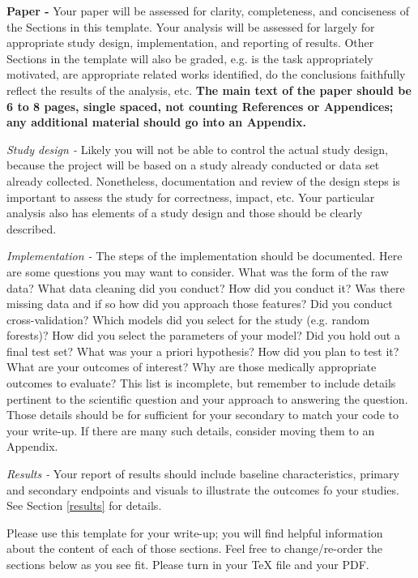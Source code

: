 \documentclass[twoside,11pt]{article}
\begin{document}
\textbf{Paper -} Your paper will be assessed for clarity, completeness, and conciseness of the Sections in this template. Your analysis will be assessed for largely for appropriate study design, implementation, and reporting of results. Other Sections in the template will also be graded, e.g. is the task appropriately motivated, are appropriate related works identified, do the conclusions faithfully reflect the results of the analysis, etc. \textbf{The main text of the paper should be 6 to 8 pages, single spaced, not counting References or Appendices; any additional material should go into an Appendix.}

\emph{Study design -} Likely you will not be able to control the actual study design, because the project will be based on a study already conducted or data set already collected. Nonetheless, documentation and review of the design steps is important to assess the study for correctness, impact, etc. Your particular analysis also has elements of a study design and those should be clearly described.

\emph{Implementation -} The steps of the implementation should be documented. Here are some questions you may want to consider. What was the form of the raw data? What data cleaning did you conduct? How did you conduct it? Was there missing data and if so how did you approach those features? Did you conduct cross-validation? Which models did you select for the study (e.g. random forests)? How did you select the parameters of your model? Did you hold out a final test set? What was your a priori hypothesis? How did you plan to test it? What are your outcomes of interest? Why are those medically appropriate outcomes to evaluate? This list is incomplete, but remember to include details pertinent to the scientific question and your approach to answering the question. Those details should be for sufficient for your secondary to match your code to your write-up. If there are many such details, consider moving them to an Appendix.

\emph{Results -} Your report of results should include baseline characteristics, primary and secondary endpoints and visuals to illustrate the outcomes fo your studies. See Section \ref{results} for details.

Please use this template for your write-up; you will find helpful information about the content of each of those sections. Feel free to change/re-order the sections below as you see fit. Please turn in your TeX file and your PDF.
\end{document}

